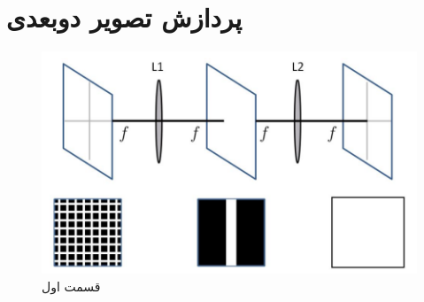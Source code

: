 \section{ پردازش تصویر دوبعدی}


\begin{figure}[h]
    \caption{قسمت اول}
    \centering
    \includegraphics*[width=0.5\linewidth]{pics/q5_1.png}
\end{figure}

